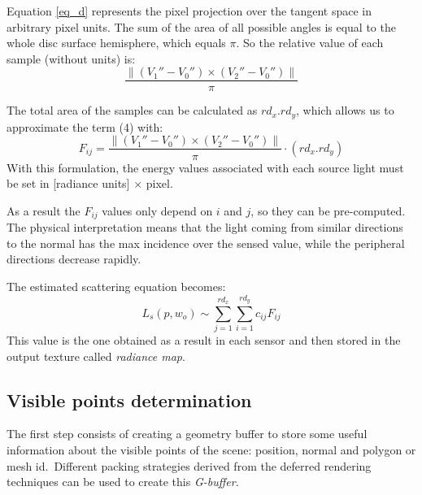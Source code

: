 \documentclass[10pt, conference]{IEEEtran}
\begin{document}
Equation \ref{eq_d} represents the pixel projection over the tangent space in arbitrary pixel units. The sum of the area of all possible angles is equal to the whole disc surface hemisphere, which equals $\pi$. So the relative value of each sample (without units) is:\
\[ 
	\frac{ \left\|{ (V_1'' - V_0'') \times (V_2'' - V_0'') }\right\| }{\pi}
\]

The total area of the samples can be calculated as $rd_x . rd_y$, which allows us to approximate the term (4) with:\
\[ 
	F_{ij} =  \frac{ \left\|{ (V_1'' - V_0'') \times (V_2'' - V_0'') }\right\| }{\pi} \cdotp (rd_x . rd_y)
\]
With this formulation, the energy values associated with each source light must be set in [radiance units] $\times$ pixel.\

As a result the $F_{ij}$ values only depend on $i$ and $j$, so they can be pre-computed. The physical interpretation means that the light 
coming from similar directions to the normal has the max incidence over the sensed value, while the peripheral directions decrease rapidly.\

The estimated scattering equation becomes:\
\[
	L_s(p, w_o) \sim \sum_{j=1}^{rd_x} \sum_{i=1}^{rd_y} c_{ij} F_{ij}
\]
This value is the one obtained as a result in each sensor and then stored in the output texture called \emph{radiance map}.

\subsection{Visible points determination}
The first step consists of creating a geometry buffer to store some useful information about the visible points of the scene: position, normal and polygon or mesh id.\
Different packing strategies derived from the deferred rendering techniques \cite{deferred_rendering} can be used to create this \emph{G-buffer}. 

\end{document}
